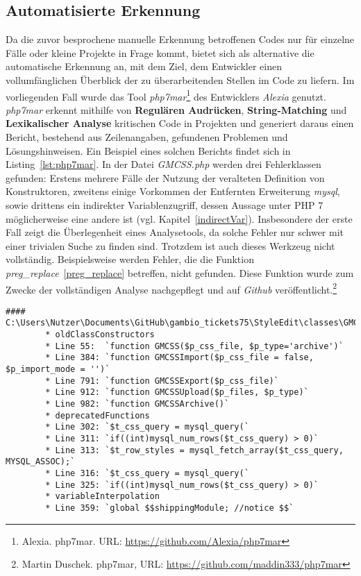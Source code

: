     \subsection{Automatisierte Erkennung}\label{automatic}
        Da die zuvor besprochene manuelle Erkennung betroffenen Codes nur für einzelne Fälle oder kleine Projekte in Frage kommt, bietet sich als alternative die 
        automatische Erkennung an, mit dem Ziel, dem Entwickler einen vollumfänglichen Überblick der zu überarbeitenden Stellen im Code zu liefern. Im vorliegenden Fall
        wurde das Tool \textit{\ac{php7mar}}\footnote{Alexia. php7mar. URL: \url{https://github.com/Alexia/php7mar}} des Entwicklers \textit{Alexia} genutzt.
        \textit{\ac{php7mar}} erkennt mithilfe von \textbf{Regulären Audrücken}, \textbf{String-Matching} und \textbf{Lexikalischer Analyse} kritischen Code in 
        Projekten und generiert daraus einen Bericht, bestehend aus Zeilenangaben, gefundenen Problemen und Lösungshinweisen. Ein Beispiel eines solchen Berichts findet
        sich in Listing~\ref{lst:php7mar}. In der Datei \textit{GMCSS.php} werden drei Fehlerklassen gefunden: Erstens mehrere Fälle der Nutzung der veralteten Definition von
        Konstruktoren, zweitens einige Vorkommen der Entfernten Erweiterung \textit{mysql}, sowie drittens ein indirekter Variablenzugriff, dessen Aussage unter PHP 7
        möglicherweise eine andere ist (vgl. Kapitel~\ref{indirectVar}). Insbesondere der erste Fall zeigt die Überlegenheit eines Analysetools, da solche Fehler nur
        schwer mit einer trivialen Suche zu finden sind. Trotzdem ist auch dieses Werkzeug nicht vollständig. Beispielsweise werden Fehler, die die Funktion 
        \textit{preg\_replace}~\ref{preg_replace} betreffen, nicht gefunden. Diese Funktion wurde zum Zwecke der vollständigen Analyse nachgepflegt und auf 
        \textit{Github} veröffentlicht.\footnote{Martin Duschek. php7mar, URL: \url{https://github.com/maddin333/php7mar}}

        \begin{lstlisting}[caption={Beispiel eines generierten Berichts mit \textit{\ac{php7mar}}}, label={lst:php7mar}]
        #### C:\Users\Nutzer\Documents\GitHub\gambio_tickets75\StyleEdit\classes\GMCSS.php
        * oldClassConstructors
        * Line 55:  `function GMCSS($p_css_file, $p_type='archive')`
        * Line 384: `function GMCSSImport($p_css_file = false, $p_import_mode = '')`
        * Line 791: `function GMCSSExport($p_css_file)`
        * Line 912: `function GMCSSUpload($p_files, $p_type)`
        * Line 982: `function GMCSSArchive()`
        * deprecatedFunctions
        * Line 302: `$t_css_query = mysql_query(`
        * Line 311: `if((int)mysql_num_rows($t_css_query) > 0)`
        * Line 313: `$t_row_styles = mysql_fetch_array($t_css_query, MYSQL_ASSOC);`
        * Line 316: `$t_css_query = mysql_query(`
        * Line 325: `if((int)mysql_num_rows($t_css_query) > 0)`
        * variableInterpolation
        * Line 359: `global $$shippingModule; //notice $$`
        \end{lstlisting}

